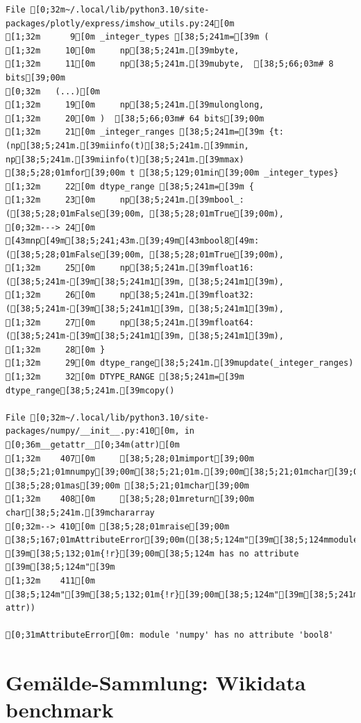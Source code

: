 \documentclass[
  letterpaper,
]{book}
\begin{document}
\begin{verbatim}
File [0;32m~/.local/lib/python3.10/site-packages/plotly/express/imshow_utils.py:24[0m
[1;32m      9[0m _integer_types [38;5;241m=[39m (
[1;32m     10[0m     np[38;5;241m.[39mbyte,
[1;32m     11[0m     np[38;5;241m.[39mubyte,  [38;5;66;03m# 8 bits[39;00m
[0;32m   (...)[0m
[1;32m     19[0m     np[38;5;241m.[39mulonglong,
[1;32m     20[0m )  [38;5;66;03m# 64 bits[39;00m
[1;32m     21[0m _integer_ranges [38;5;241m=[39m {t: (np[38;5;241m.[39miinfo(t)[38;5;241m.[39mmin, np[38;5;241m.[39miinfo(t)[38;5;241m.[39mmax) [38;5;28;01mfor[39;00m t [38;5;129;01min[39;00m _integer_types}
[1;32m     22[0m dtype_range [38;5;241m=[39m {
[1;32m     23[0m     np[38;5;241m.[39mbool_: ([38;5;28;01mFalse[39;00m, [38;5;28;01mTrue[39;00m),
[0;32m---> 24[0m     [43mnp[49m[38;5;241;43m.[39;49m[43mbool8[49m: ([38;5;28;01mFalse[39;00m, [38;5;28;01mTrue[39;00m),
[1;32m     25[0m     np[38;5;241m.[39mfloat16: ([38;5;241m-[39m[38;5;241m1[39m, [38;5;241m1[39m),
[1;32m     26[0m     np[38;5;241m.[39mfloat32: ([38;5;241m-[39m[38;5;241m1[39m, [38;5;241m1[39m),
[1;32m     27[0m     np[38;5;241m.[39mfloat64: ([38;5;241m-[39m[38;5;241m1[39m, [38;5;241m1[39m),
[1;32m     28[0m }
[1;32m     29[0m dtype_range[38;5;241m.[39mupdate(_integer_ranges)
[1;32m     32[0m DTYPE_RANGE [38;5;241m=[39m dtype_range[38;5;241m.[39mcopy()

File [0;32m~/.local/lib/python3.10/site-packages/numpy/__init__.py:410[0m, in [0;36m__getattr__[0;34m(attr)[0m
[1;32m    407[0m     [38;5;28;01mimport[39;00m [38;5;21;01mnumpy[39;00m[38;5;21;01m.[39;00m[38;5;21;01mchar[39;00m [38;5;28;01mas[39;00m [38;5;21;01mchar[39;00m
[1;32m    408[0m     [38;5;28;01mreturn[39;00m char[38;5;241m.[39mchararray
[0;32m--> 410[0m [38;5;28;01mraise[39;00m [38;5;167;01mAttributeError[39;00m([38;5;124m"[39m[38;5;124mmodule [39m[38;5;132;01m{!r}[39;00m[38;5;124m has no attribute [39m[38;5;124m"[39m
[1;32m    411[0m                      [38;5;124m"[39m[38;5;132;01m{!r}[39;00m[38;5;124m"[39m[38;5;241m.[39mformat([38;5;18m__name__[39m, attr))

[0;31mAttributeError[0m: module 'numpy' has no attribute 'bool8'
\end{verbatim}


\chapter{Gemälde-Sammlung: Wikidata
benchmark}\label{gemuxe4lde-sammlung-wikidata-benchmark}
\end{document}
